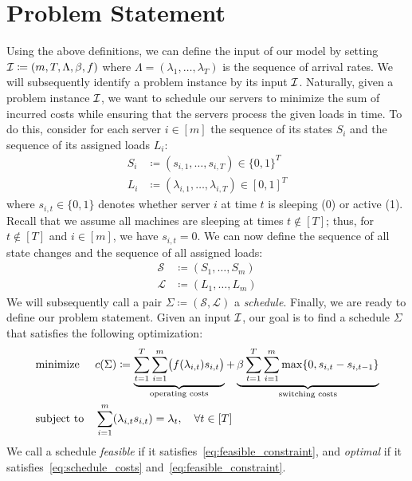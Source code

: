 \section{Problem Statement}
Using the above definitions, we can define the input of our model by setting $\mathcal{I}\coloneqq(m,T,\Lambda,\beta,f)$ where $\Lambda=(\lambda_1,\dotsc,\lambda_T)$ is the sequence of arrival rates. We will subsequently identify a problem instance by its input $\mathcal{I}$. Naturally, given a problem instance $\mathcal{I}$, we want to schedule our servers to minimize the sum of incurred costs while ensuring that the servers process the given loads in time. To do this, consider for each server $i\in[m]$ the sequence of its states $S_i$ and the sequence of its assigned loads $L_i$:
\begin{align*}
	S_i&\coloneqq(s_{i,1},\dotsc,s_{i,T})\in\{0,1\}^T\\
	L_i&\coloneqq(\lambda_{i,1},\dotsc,\lambda_{i,T})\in[0,1]^T
\end{align*}
where $s_{i,t}\in\{0,1\}$ denotes whether server $i$ at time $t$ is sleeping (0) or active (1). Recall that we assume all machines are sleeping at times $t\notin[T]$; thus, for $t\notin[T]$ and $i\in[m]$, we have $s_{i,t}=0$. We can now define the sequence of all state changes and the sequence of all assigned loads:
\begin{align*}
	\mathcal{S}&\coloneqq(S_1,\dotsc,S_m)\\
	\mathcal{L}&\coloneqq(L_1,\dotsc,L_m)
\end{align*}
We will subsequently call a pair $\Sigma\coloneqq(\mathcal{S},\mathcal{L})$ a \emph{schedule}. Finally, we are ready to define our problem statement. Given an input $\mathcal{I}$, our goal is to find a schedule $\Sigma$ that satisfies the following optimization:
\begin{align}
	&\text{minimize}&&c(\Sigma)\coloneqq\underbrace{\sum\limits_{t=1}^{T}\sum\limits_{i=1}^{m}\bigl(f(\lambda_{i,t}) s_{i,t}\bigr)}_{\text{operating costs}}+\underbrace{\beta\sum\limits_{t=1}^{T}\sum\limits_{i=1}^{m}\max\{0,s_{i,t}-s_{i,t-1}\}}_{\text{switching costs}}\label{eq:schedule_costs}\\ 
	&\text{subject to}&&\sum\limits_{i=1}^{m}(\lambda_{i,t} s_{i,t})=\lambda_t,\quad \forall t\in[T]\label{eq:feasible_constraint}
\end{align}
We call a schedule \emph{feasible} if it satisfies~\eqref{eq:feasible_constraint}, and \emph{optimal} if it satisfies~\eqref{eq:schedule_costs} and~\eqref{eq:feasible_constraint}.
